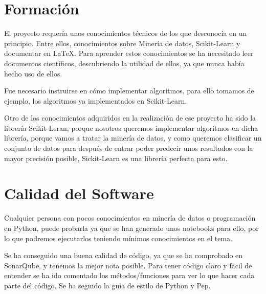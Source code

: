 
\section{Formación}
El proyecto requería unos conocimientos técnicos de los que desconocía en un principio. Entre ellos, conocimientos sobre Minería de datos, Scikit-Learn y documentar en \LaTeX. Para aprender estos conocimientos se ha necesitado leer documentos científicos, descubriendo la utilidad de ellos, ya que nunca había hecho uso de ellos.

Fue necesario instruirse en cómo implementar algoritmos, para ello tomamos de ejemplo, los algoritmos ya implementados en Scikit-Learn.

Otro de los conocimientos adquiridos en la realización de ese proyecto ha sido la librería Scikit-Leran, porque nosotros queremos implementar algoritmos en dicha librería, porque vamos a tratar la minería de datos, y como queremos clasificar un conjunto de datos para después de entrar poder predecir unos resultados con la mayor precisión posible, Sickit-Learn es una librería perfecta para esto. 

\section{Calidad del Software}
Cualquier persona con pocos conocimientos en minería de datos o programación en Python, puede probarla ya que se han generado unos notebooks para ello, por lo que podremos ejecutarlos teniendo mínimos conocimientos en el tema.

Se ha conseguido una buena calidad de código, ya que se ha comprobado en SonarQube, y tenemos la mejor nota posible. Para tener código claro y fácil de entender se ha ido comentado los métodos/funciones para ver lo que hacer cada parte del código. Se ha seguido la guía de estilo de Python y Pep.